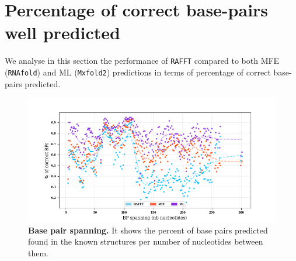 \section{Percentage of correct base-pairs well predicted}
We analyse in this section the performance of \texttt{RAFFT} compared to both \ac{MFE} (\texttt{RNAfold}) and \ac{ML} (\texttt{Mxfold2}) predictions in terms of percentage of correct base-pairs predicted.
\begin{figure}[H]
	\centering
	\includegraphics[width=1.\linewidth]{../res/images/rafft/bp_spanning.png}
	\caption{\textbf{Base pair spanning.} It shows the percent of base pairs predicted found in the known structures per number of nucleotides between them.}
\end{figure}

